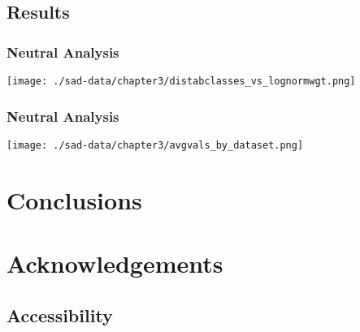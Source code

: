 \documentclass[17pt]{beamer}
\begin{document}
\subsection{Results}
\begin{frame}{}
\frametitle{Neutral Analysis}
\texttt{[image: ./sad-data/chapter3/distabclasses\_vs\_lognormwgt.png]}
\end{frame}

\begin{frame}{}
\frametitle{Neutral Analysis}
\texttt{[image: ./sad-data/chapter3/avgvals\_by\_dataset.png]}
\end{frame}

\section{Conclusions}

\section{Acknowledgements}
\subsection{Accessibility}
\end{document}
